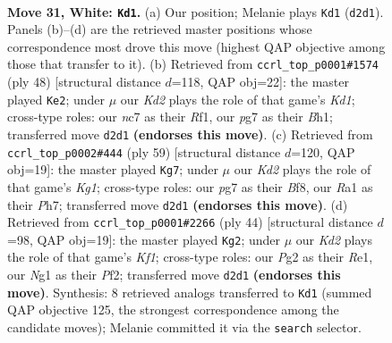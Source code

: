 \documentclass[11pt]{article}
\begin{document}
\clearpage

\begin{figure}[p]\centering
\begin{subfigure}{0.46\textwidth}\centering
\resizebox{\linewidth}{!}{%
\newchessgame
\chessboard[
  setfen={2r2b2/2nkn1pr/6b1/7p/p1B1pP1P/P5R1/1P1K2P1/R5NN w - - 22 31},
  showmover=false,
  pgfstyle=straightmove, color=movearrow, markmove={d2-d1}
]}
\caption{}
\end{subfigure}\hfill
\begin{subfigure}{0.46\textwidth}\centering
\resizebox{\linewidth}{!}{%
\newchessgame
\chessboard[
  setfen={1n3r2/rb2kp2/pb2p2p/1p2P3/4NP2/1N6/PPR4P/3K1R1B w - - 5 25},
  showmover=false,
  pgfstyle=straightmove, color=movearrow, markmove={d1-e2}
]}
\caption{}
\end{subfigure}
\\[4pt]
\begin{subfigure}{0.46\textwidth}\centering
\resizebox{\linewidth}{!}{%
\newchessgame
\chessboard[
  setfen={5bk1/7p/pNN1rpp1/1n6/1P2pP2/4B1Pb/4PK1P/2R5 b - - 2 30},
  showmover=false,
  pgfstyle=straightmove, color=movearrow, markmove={g8-g7}
]}
\caption{}
\end{subfigure}\hfill
\begin{subfigure}{0.46\textwidth}\centering
\resizebox{\linewidth}{!}{%
\newchessgame
\chessboard[
  setfen={r2r4/4bkpp/2p2n2/p7/NpP2B2/1P6/P4P1P/3RRK2 w - - 0 23},
  showmover=false,
  pgfstyle=straightmove, color=movearrow, markmove={f1-g2}
]}
\caption{}
\end{subfigure}
\caption{\textbf{Move 31, White: \texttt{Kd1}.} (a) Our position; Melanie plays \texttt{Kd1} (\texttt{d2d1}). Panels (b)--(d) are the retrieved master positions whose correspondence most drove this move (highest QAP objective among those that transfer to it). (b) Retrieved from \texttt{ccrl\_top\_p0001\#1574} (ply 48) [structural distance $d$=118, QAP obj=22]: the master played \texttt{Ke2}; under $\mu$ our \emph{Kd2} plays the role of that game's \emph{Kd1}; cross-type roles: our \emph{n}c7 as their \emph{R}f1, our \emph{p}g7 as their \emph{B}h1; transferred move \texttt{d2d1} \textbf{(endorses this move)}. (c) Retrieved from \texttt{ccrl\_top\_p0002\#444} (ply 59) [structural distance $d$=120, QAP obj=19]: the master played \texttt{Kg7}; under $\mu$ our \emph{Kd2} plays the role of that game's \emph{Kg1}; cross-type roles: our \emph{p}g7 as their \emph{B}f8, our \emph{R}a1 as their \emph{P}h7; transferred move \texttt{d2d1} \textbf{(endorses this move)}. (d) Retrieved from \texttt{ccrl\_top\_p0001\#2266} (ply 44) [structural distance $d$=98, QAP obj=19]: the master played \texttt{Kg2}; under $\mu$ our \emph{Kd2} plays the role of that game's \emph{Kf1}; cross-type roles: our \emph{P}g2 as their \emph{R}e1, our \emph{N}g1 as their \emph{P}f2; transferred move \texttt{d2d1} \textbf{(endorses this move)}. Synthesis: 8 retrieved analogs transferred to \texttt{Kd1} (summed QAP objective 125, the strongest correspondence among the candidate moves); Melanie committed it via the \texttt{search} selector.}
\label{fig:thought-m60}
\end{figure}
\end{document}
